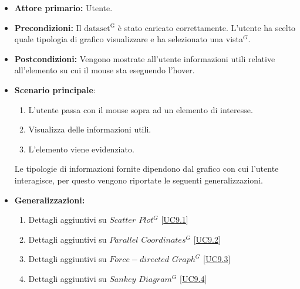 \begin{itemize}
    \item \textbf{Attore primario:} Utente.
    \item \textbf{Precondizioni:} Il ${\mathrm{dataset^{G}}}$ è stato caricato correttamente. L'utente ha scelto quale tipologia di grafico visualizzare e ha selezionato una vista$^{G}$.
    \item \textbf{Postcondizioni:} Vengono mostrate all'utente informazioni utili relative all'elemento su cui il mouse sta eseguendo l'hover.
    \item \textbf{Scenario principale}: 
    \begin{enumerate}
		\item L'utente passa con il mouse sopra ad un elemento di interesse. 
		\item Visualizza delle informazioni utili.
		\item L'elemento viene evidenziato. 
	\end{enumerate}
	Le tipologie di informazioni fornite dipendono dal grafico con cui l'utente interagisce, per questo vengono riportate le seguenti generalizzazioni.
    \item \textbf{Generalizzazioni:} \begin{enumerate}
                                        \item Dettagli aggiuntivi su \textit{$Scatter$ $Plot^{G}$} [\hyperref[sec:UC9.1]{UC9.1}]
                                        \item Dettagli aggiuntivi su \textit{$Parallel$ $Coordinates^{G}$} [\hyperref[sec:UC9.2]{UC9.2}]
                                        \item Dettagli aggiuntivi su \textit{$Force-directed$ $Graph^{G}$} [\hyperref[sec:UC9.3]{UC9.3}]
                                        \item Dettagli aggiuntivi su \textit{$Sankey$ $Diagram^{G}$} [\hyperref[sec:UC9.4]{UC9.4}]
                                    \end{enumerate}
\end{itemize}

